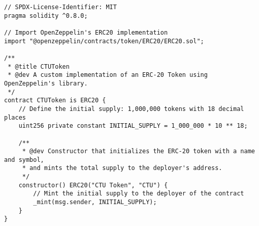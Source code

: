 \documentclass[12pt]{article}
\begin{document}
\begin{lstlisting}[language=Solidity]
// SPDX-License-Identifier: MIT
pragma solidity ^0.8.0;

// Import OpenZeppelin's ERC20 implementation
import "@openzeppelin/contracts/token/ERC20/ERC20.sol";

/**
 * @title CTUToken
 * @dev A custom implementation of an ERC-20 Token using OpenZeppelin's library.
 */
contract CTUToken is ERC20 {
    // Define the initial supply: 1,000,000 tokens with 18 decimal places
    uint256 private constant INITIAL_SUPPLY = 1_000_000 * 10 ** 18;

    /**
     * @dev Constructor that initializes the ERC-20 token with a name and symbol,
     * and mints the total supply to the deployer's address.
     */
    constructor() ERC20("CTU Token", "CTU") {
        // Mint the initial supply to the deployer of the contract
        _mint(msg.sender, INITIAL_SUPPLY);
    }
}
\end{lstlisting}
\end{document}
